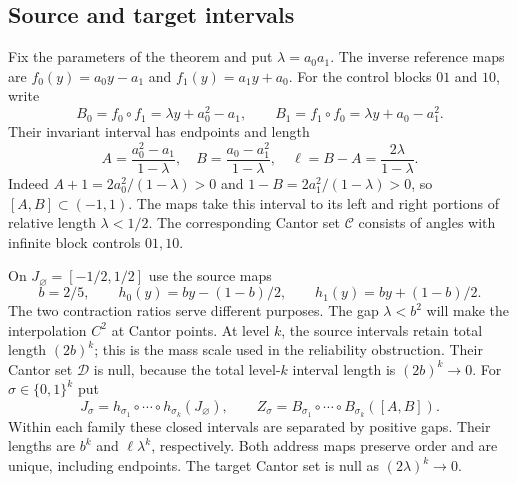 \documentclass[11pt]{amsart}
\theoremstyle{definition}
\theoremstyle{remark}
\numberwithin{equation}{section}
\begin{document}
\subsection{Source and target intervals}
Fix the parameters of the theorem and put $\lambda=a_0a_1$.
The inverse reference maps are $f_0(y)=a_0y-a_1$ and
$f_1(y)=a_1y+a_0$. For the control blocks $01$ and $10$, write
\[
B_0=f_0\circ f_1=\lambda y+a_0^2-a_1,\qquad
B_1=f_1\circ f_0=\lambda y+a_0-a_1^2.
\]
Their invariant interval has endpoints and length
\begin{equation}\label{eq:cantorendpoints}
A=\frac{a_0^2-a_1}{1-\lambda},\quad
B=\frac{a_0-a_1^2}{1-\lambda},\quad
\ell=B-A=\frac{2\lambda}{1-\lambda}.
\end{equation}
Indeed $A+1=2a_0^2/(1-\lambda)>0$ and
$1-B=2a_1^2/(1-\lambda)>0$, so $[A,B]\subset(-1,1)$.
The maps take this interval to its left and right portions of
relative length $\lambda<1/2$. The corresponding Cantor set
$\mathcal C$ consists of angles with infinite block controls $01,10$.

On $J_\varnothing=[-1/2,1/2]$ use the source maps
\[
b=2/5,\qquad h_0(y)=by-(1-b)/2,
\qquad h_1(y)=by+(1-b)/2.
\]
The two contraction ratios serve different purposes. The gap
$\lambda<b^2$ will make the interpolation $C^2$ at Cantor points.
At level $k$, the source intervals retain total length $(2b)^k$;
this is the mass scale used in the reliability obstruction.
Their Cantor set $\mathcal D$ is null, because the total level-$k$
interval length is $(2b)^k\to0$. For $\sigma\in\{0,1\}^k$ put
\[
J_\sigma=h_{\sigma_1}\circ\cdots\circ h_{\sigma_k}(J_\varnothing),
\qquad Z_\sigma=B_{\sigma_1}\circ\cdots\circ B_{\sigma_k}([A,B]).
\]
Within each family these closed intervals are separated by positive
gaps. Their lengths are $b^k$ and $\ell\lambda^k$, respectively.
Both address maps preserve order and are unique, including endpoints.
The target Cantor set is null as $(2\lambda)^k\to0$.
\end{document}
